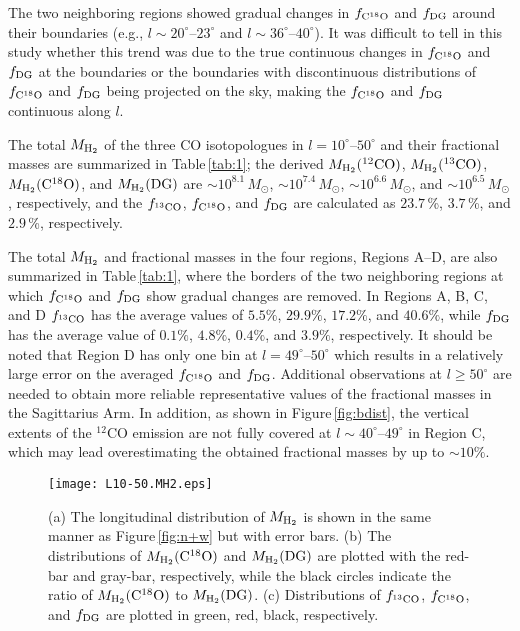 \documentclass[proof]{pasj01}
\newcommand{\fDG}{f_{\rm DG}}
\newcommand{\fthree}{f_{\rm ^{13}CO}}
\newcommand{\feight}{f_{\rm C^{18}O}}
\newcommand{\mH}{M_{\rm H_2}}
\newcommand{\mDG}{M_{\rm H_2}{\rm (DG)}}
\newcommand{\mtwo}{M_{\rm H_2}{\rm (^{12}CO)}}
\newcommand{\mthree}{M_{\rm H_2}{\rm (^{13}CO)}}
\newcommand{\meight}{M_{\rm H_2}{\rm (C^{18}O)}}
\begin{document}
The two neighboring regions showed gradual changes in $\feight$ and $\fDG$ around their boundaries (e.g., $l\sim20^\circ$--$23^\circ$ and $l\sim36^\circ$--$40^\circ$).
It was difficult to tell in this study whether this trend was due to the true continuous changes in $\feight$ and $\fDG$ at the boundaries or the boundaries with discontinuous distributions of $\feight$ and $\fDG$ being projected on the sky, making the $\feight$ and $\fDG$ continuous along $l$.

The total $\mH$ of the three CO isotopologues in $l=10^\circ$--$50^\circ$ and their fractional masses are summarized in Table\,\ref{tab:1}; the derived $\mtwo$, $\mthree$, $\meight$, and $\mDG$ are $\sim10^{8.1}$\,$M_\odot$, $\sim10^{7.4}$\,$M_\odot$, $\sim10^{6.6}$\,$M_\odot$, and $\sim10^{6.5}$\,$M_\odot$, respectively, and the $\fthree$, $\feight$, and $\fDG$ are calculated as $23.7$\,\%, $3.7$\,\%, and $2.9$\,\%, respectively.

The total $\mH$ and fractional masses in the four regions, Regions A--D, are also summarized in Table\,\ref{tab:1}, where the borders of the two neighboring regions at which $\feight$ and $\fDG$ show gradual changes are removed.
In Regions A, B, C, and D $\fthree$ has the average values of $5.5\%$, $29.9\%$, $17.2\%$, and $40.6\%$, while $\fDG$ has the average value of $0.1\%$, $4.8\%$, $0.4\%$, and $3.9\%$, respectively.
It should be noted that Region D has only one bin at $l=49^\circ$--$50^\circ$ which results in a relatively large error on the averaged $\feight$ and $\fDG$.
Additional observations at $l \geq 50^\circ$ are needed to obtain more reliable representative values of the fractional masses in the Sagittarius Arm. 
In addition, as shown in Figure\,\ref{fig:bdist}, the vertical extents of the $^{12}$CO emission are not fully covered at $l\sim40^\circ$--$49^\circ$ in Region C, which may lead overestimating the obtained fractional masses by up to $\sim10\%$.


\begin{figure}
 \begin{center}
  \texttt{[image: L10-50.MH2.eps]}
 \end{center}
 \caption{(a) The longitudinal distribution of $\mH$ is shown in the same manner as Figure\,\ref{fig:n+w} but with error bars. (b) The distributions of $\meight$ and $\mDG$ are plotted with the red-bar and gray-bar, respectively, while the black circles indicate the ratio of $\meight$ to $\mDG$. (c) Distributions of $\fthree$, $\feight$, and $\fDG$ are plotted in green, red, black, respectively.} \label{fig:m}
\end{figure}
\end{document}
